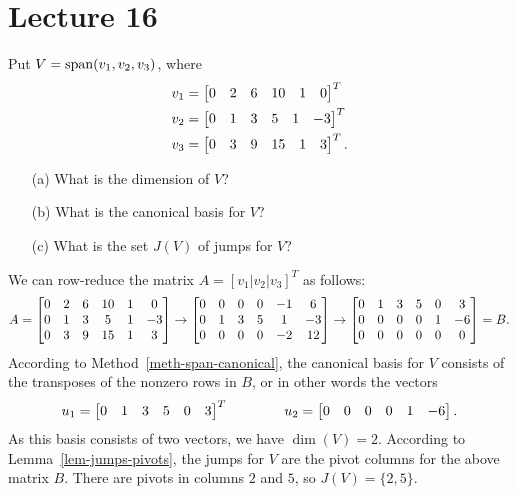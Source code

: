 \documentclass[a4paper]{amsart}
\renewenvironment{solution}{\SolutionInline}{\endSolutionInline}
\begin{document}
\section{Lecture 16}

\begin{exercise}\label{ex-jumps-i}
 Put $V=\operatorname{span}(v_1,v_2,v_3)$, where
 \begin{align*}
  v_1 &= \left[\begin{matrix} 0&2&6&10&1&0 \end{matrix}\right]^T \\
  v_2 &= \left[\begin{matrix} 0&1&3&5&1&-3 \end{matrix}\right]^T \\
  v_3 &= \left[\begin{matrix} 0&3&9&15&1&3 \end{matrix}\right]^T.
 \end{align*}
 \begin{itemize}
  \item[(a)] What is the dimension of $V$?
  \item[(b)] What is the canonical basis for $V$?
  \item[(c)] What is the set $J(V)$ of jumps for $V$?
 \end{itemize}
\end{exercise}
\begin{solution}
 We can row-reduce the matrix $A=[v_1|v_2|v_3]^T$ as follows:
 \[ A =
    \left[\begin{matrix} 
     0&2&6&10&1&0 \\
     0&1&3&5&1&-3 \\
     0&3&9&15&1&3
    \end{matrix}\right]
    \to
    \left[\begin{matrix} 
     0&0&0&0&-1&6 \\
     0&1&3&5&1&-3 \\
     0&0&0&0&-2&12
    \end{matrix}\right]
    \to
    \left[\begin{matrix} 
     0&1&3&5&0& 3 \\
     0&0&0&0&1&-6 \\
     0&0&0&0&0&0
    \end{matrix}\right]
    = B.
 \]
 According to Method~\ref{meth-span-canonical}, the canonical basis
 for $V$ consists of the transposes of the nonzero rows in $B$, or in
 other words the vectors
 \[ u_1=\left[\begin{matrix} 0&1&3&5&0&3\end{matrix}\right]^T \hspace{4em}
    u_2=\left[\begin{matrix} 0&0&0&0&1&-6 \end{matrix}\right].
 \]
 As this basis consists of two vectors, we have $\dim(V)=2$.
 According to Lemma~\ref{lem-jumps-pivots}, the jumps for $V$ are the
 pivot columns for the above matrix $B$.  There are pivots in columns
 $2$ and $5$, so $J(V)=\{2,5\}$.
\end{solution}
\end{document}
